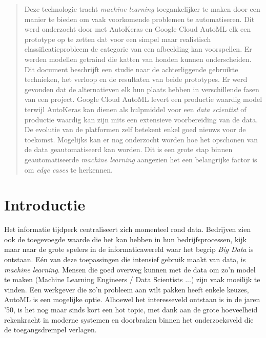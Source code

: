 \documentclass[a0,portrait]{a0poster}
\begin{document}
\begin{multicols}{2} %


\color{HoGentAccent1} %

\begin{abstract}
Deze technologie tracht \textit{machine learning} toegankelijker te maken door een manier te bieden om vaak voorkomende problemen te automatiseren. Dit werd onderzocht door met AutoKeras en Google Cloud AutoML elk een prototype op te zetten dat voor een simpel maar realistisch classificatieprobleem de categorie van een afbeelding kan voorspellen. Er werden modellen getraind die katten van honden kunnen onderscheiden. Dit document beschrijft een studie naar de achterliggende gebruikte technieken, het verloop en de resultaten van beide prototypes. Er werd gevonden dat de alternatieven elk hun plaats hebben in verschillende fasen van een project. Google Cloud AutoML levert een productie waardig model terwijl AutoKeras kan dienen als hulpmiddel voor een \textit{data scientist} of productie waardig kan zijn mits een extensieve voorbereiding van de data. De evolutie van de platformen zelf betekent enkel goed nieuws voor de toekomst. Mogelijks kan er nog onderzocht worden hoe het opschonen van de data geautomatiseerd kan worden. Dit is een grote stap binnen geautomatiseerde \textit{machine learning} aangezien het een belangrijke factor is om \textit{edge cases} te herkennen.
\end{abstract}

\color{HoGentAccent1} 
\section*{Introductie}
\color{black}
\color{black}

Het informatie tijdperk centraliseert zich momenteel rond data. Bedrijven zien ook de toegevoegde waarde die het kan hebben in hun bedrijfsprocessen, kijk maar naar de grote spelers in de informaticawereld waar het begrip \textit{Big Data} is ontstaan. Eén van deze toepassingen die intensief gebruik maakt van data, is \textit{machine learning}. Mensen die goed overweg kunnen met de data om zo'n model te maken (Machine Learning Engineers / Data Scientists ...)  zijn vaak moeilijk te vinden. Een werkgever die zo'n probleem aan wilt pakken heeft enkele keuzes, AutoML is een mogelijke optie. Alhoewel het interesseveld ontstaan is in de jaren '50, is het nog maar sinds kort een hot topic, met dank aan de grote hoeveelheid rekenkracht in moderne systemen en doorbraken binnen het onderzoeksveld die de toegangsdrempel verlagen.


\end{multicols}
\end{document}
